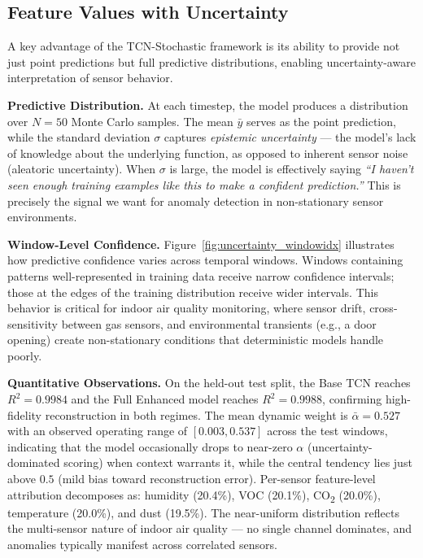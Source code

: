 \subsection{Feature Values with Uncertainty}

A key advantage of the TCN-Stochastic framework is its ability to provide not just point predictions but full predictive distributions, enabling uncertainty-aware interpretation of sensor behavior.

\textbf{Predictive Distribution.} At each timestep, the model produces a distribution over $N=50$ Monte Carlo samples. The mean $\bar{y}$ serves as the point prediction, while the standard deviation $\sigma$ captures \emph{epistemic uncertainty} — the model's lack of knowledge about the underlying function, as opposed to inherent sensor noise (aleatoric uncertainty). When $\sigma$ is large, the model is effectively saying \textit{``I haven't seen enough training examples like this to make a confident prediction.''} This is precisely the signal we want for anomaly detection in non-stationary sensor environments.

\textbf{Window-Level Confidence.} Figure~\ref{fig:uncertainty_windowidx} illustrates how predictive confidence varies across temporal windows. Windows containing patterns well-represented in training data receive narrow confidence intervals; those at the edges of the training distribution receive wider intervals. This behavior is critical for indoor air quality monitoring, where sensor drift, cross-sensitivity between gas sensors, and environmental transients (e.g., a door opening) create non-stationary conditions that deterministic models handle poorly.



\textbf{Quantitative Observations.} On the held-out test split, the Base TCN reaches $R^2 = 0.9984$ and the Full Enhanced model reaches $R^2 = 0.9988$, confirming high-fidelity reconstruction in both regimes. The mean dynamic weight is $\bar{\alpha} = 0.527$ with an observed operating range of $[0.003, 0.537]$ across the test windows, indicating that the model occasionally drops to near-zero $\alpha$ (uncertainty-dominated scoring) when context warrants it, while the central tendency lies just above $0.5$ (mild bias toward reconstruction error). Per-sensor feature-level attribution decomposes as: humidity (20.4\%), VOC (20.1\%), CO\textsubscript{2} (20.0\%), temperature (20.0\%), and dust (19.5\%). The near-uniform distribution reflects the multi-sensor nature of indoor air quality --- no single channel dominates, and anomalies typically manifest across correlated sensors.


